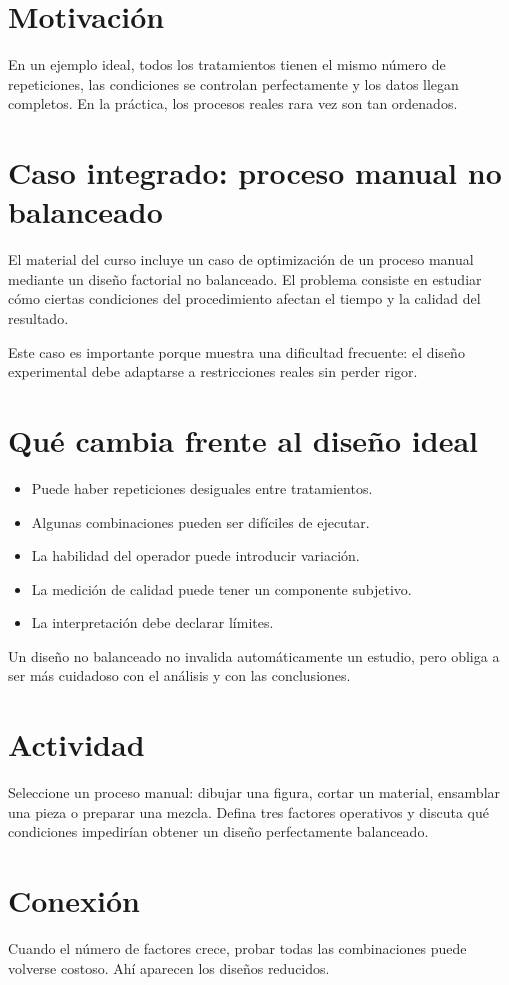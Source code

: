 
\section{Motivación}

En un ejemplo ideal, todos los tratamientos tienen el mismo número de repeticiones, las condiciones se controlan perfectamente y los datos llegan completos. En la práctica, los procesos reales rara vez son tan ordenados.

\section{Caso integrado: proceso manual no balanceado}

El material del curso incluye un caso de optimización de un proceso manual mediante un diseño factorial no balanceado. El problema consiste en estudiar cómo ciertas condiciones del procedimiento afectan el tiempo y la calidad del resultado.

Este caso es importante porque muestra una dificultad frecuente: el diseño experimental debe adaptarse a restricciones reales sin perder rigor.

\section{Qué cambia frente al diseño ideal}

\begin{itemize}
  \item Puede haber repeticiones desiguales entre tratamientos.
  \item Algunas combinaciones pueden ser difíciles de ejecutar.
  \item La habilidad del operador puede introducir variación.
  \item La medición de calidad puede tener un componente subjetivo.
  \item La interpretación debe declarar límites.
\end{itemize}

\begin{cuidado}
Un diseño no balanceado no invalida automáticamente un estudio, pero obliga a ser más cuidadoso con el análisis y con las conclusiones.
\end{cuidado}

\section{Actividad}

Seleccione un proceso manual: dibujar una figura, cortar un material, ensamblar una pieza o preparar una mezcla. Defina tres factores operativos y discuta qué condiciones impedirían obtener un diseño perfectamente balanceado.

\section{Conexión}

Cuando el número de factores crece, probar todas las combinaciones puede volverse costoso. Ahí aparecen los diseños reducidos.
